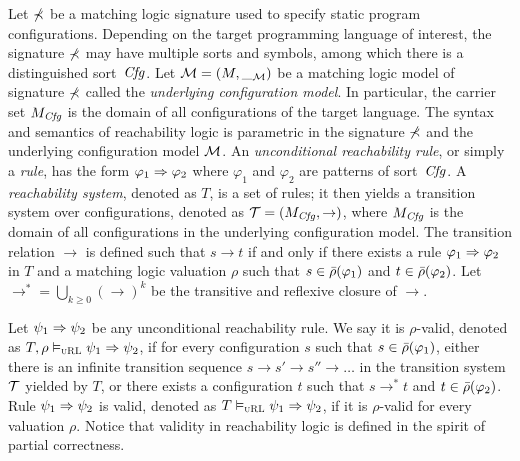 \documentclass{amsart}
\begin{document}
Let $\mathbb{\Sigma}$ be a matching logic signature 
used to specify static program configurations.
Depending on the target programming language of interest,
the signature $\mathbb{\Sigma}$
may have multiple sorts and symbols, among which there is 
a distinguished sort~$\mathit{Cfg}$.
Let $\mathcal{M} = (M, \__{\mathcal{M}})$ be a matching logic model of signature $\mathbb{\Sigma}$
called the \emph{underlying configuration model}.
In particular, the carrier set $M_{\mathit{Cfg}}$ is the domain of all configurations
of the target language.
The syntax and semantics of reachability logic is parametric in
the signature $\mathbb{\Sigma}$ and the underlying configuration model $\mathcal{M}$.
An \emph{unconditional reachability rule}, or simply a \emph{rule}, has the form
$\varphi_1 \Rightarrow \varphi_2$ where $\varphi_1$ and $\varphi_2$ are 
patterns of sort~$\mathit{Cfg}$.
A \emph{reachability system}, denoted as $T$, is a set of rules;
it then yields a transition system over configurations,
denoted as $\mathcal{T} = (M_{\mathit{Cfg}}, \to)$,
where $M_{\mathit{Cfg}}$ is the domain of all configurations in the
underlying configuration model.
The transition relation $\to$ is defined such that
$s \to t$ if and only if
there exists a rule $\varphi_1 \Rightarrow \varphi_2$ in $T$
and a matching logic valuation $\rho$ such that
$s \in \bar{\rho}(\varphi_1)$ and $t \in \bar{\rho}(\varphi_2)$.
Let $\to^* = \bigcup_{k \ge 0} (\to)^k$ 
be the transitive and reflexive closure of ${\to}$.

Let $\psi_1 \Rightarrow \psi_2$ be any unconditional reachability rule.
We say it is $\rho$-valid,
denoted as 
$T,\rho \vDash_{\textsc{uRL}} \psi_1 \Rightarrow \psi_2$,
if for every configuration $s$ such that $s \in \bar{\rho}(\varphi_1)$,
either there is an infinite transition sequence
$s \to s' \to s'' \to \dots$ in the transition system $\mathcal{T}$ yielded by $T$,
or there exists a configuration $t$
such that $s \to^* t$ and $t \in \bar{\rho}(\varphi_2)$.
Rule $\psi_1 \Rightarrow \psi_2$ is valid, denoted as $T \vDash_{\textsc{uRL}} \psi_1 \Rightarrow \psi_2$,
if it is $\rho$-valid for every valuation $\rho$.
Notice that validity in reachability logic is defined
in the spirit of partial correctness.
\end{document}
